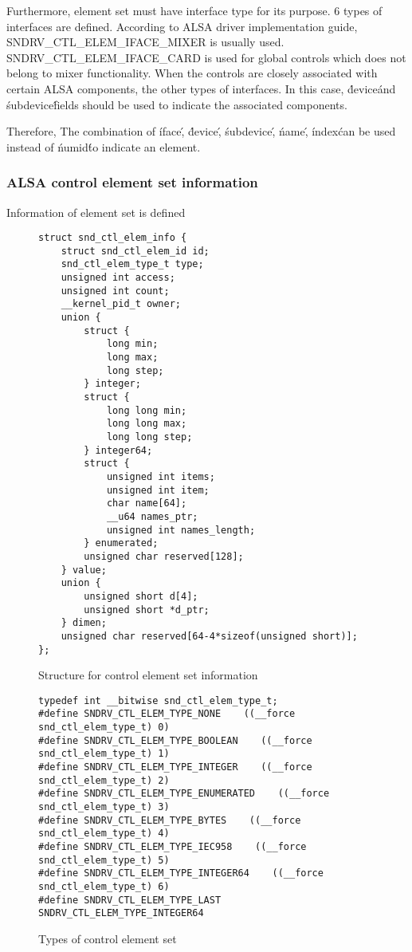 \documentclass[onecolumn]{article}
\begin{document}
Furthermore, element set must have interface type for its purpose. 6 types of interfaces are defined. According to ALSA driver implementation guide\cite{alsa-driver}, SNDRV\_CTL\_ELEM\_IFACE\_MIXER is usually used. SNDRV\_CTL\_ELEM\_IFACE\_CARD is used for global controls which does not belong to mixer functionality. When the controls are closely associated with certain ALSA components, the other types of interfaces. In this case, \'device\' and \'subdevice\' fields should be used to indicate the associated components.

Therefore, The combination of \'iface\', \'device\', \'subdevice\', \'name\', \'index\' can be used instead of \'numid\' to indicate an element.

\subsubsection{ALSA control element set information}

Information of element set is defined

\begin{figure}[htbp]
\small
\begin{verbatim}
struct snd_ctl_elem_info {
    struct snd_ctl_elem_id id;
    snd_ctl_elem_type_t type;
    unsigned int access;
    unsigned int count;
    __kernel_pid_t owner;
    union {
        struct {
            long min;
            long max;
            long step;
        } integer;
        struct {
            long long min;
            long long max;
            long long step;
        } integer64;
        struct {
            unsigned int items;
            unsigned int item;
            char name[64];
            __u64 names_ptr;
            unsigned int names_length;
        } enumerated;
        unsigned char reserved[128];
    } value;
    union {
        unsigned short d[4];
        unsigned short *d_ptr;
    } dimen;
    unsigned char reserved[64-4*sizeof(unsigned short)];
};
\end{verbatim}
\caption{{Structure for control element set information}}
\label{element-set-info-structure}
\end{figure}

\begin{figure}[htbp]
\small
\begin{verbatim}
typedef int __bitwise snd_ctl_elem_type_t;
#define SNDRV_CTL_ELEM_TYPE_NONE    ((__force snd_ctl_elem_type_t) 0)
#define SNDRV_CTL_ELEM_TYPE_BOOLEAN    ((__force snd_ctl_elem_type_t) 1)
#define SNDRV_CTL_ELEM_TYPE_INTEGER    ((__force snd_ctl_elem_type_t) 2)
#define SNDRV_CTL_ELEM_TYPE_ENUMERATED    ((__force snd_ctl_elem_type_t) 3)
#define SNDRV_CTL_ELEM_TYPE_BYTES    ((__force snd_ctl_elem_type_t) 4)
#define SNDRV_CTL_ELEM_TYPE_IEC958    ((__force snd_ctl_elem_type_t) 5)
#define SNDRV_CTL_ELEM_TYPE_INTEGER64    ((__force snd_ctl_elem_type_t) 6)
#define SNDRV_CTL_ELEM_TYPE_LAST    SNDRV_CTL_ELEM_TYPE_INTEGER64
\end{verbatim}
\caption{{Types of control element set}}
\label{element-set-types}
\end{figure}
\end{document}
